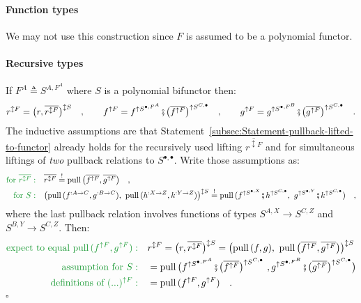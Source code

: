 \paragraph{Function types}

We may not use this construction since $F$ is assumed to be a polynomial
functor.

\paragraph{Recursive types}

If $F^{A}\triangleq S^{A,F^{A}}$ where $S$ is a polynomial bifunctor
then:
\[
r^{\updownarrow F}=\big(r,\overline{r^{\updownarrow F}}\big)^{\updownarrow S}\quad,\quad\quad f^{\uparrow F}=f^{\uparrow S^{\bullet,F^{A}}}\bef\big(\overline{f^{\uparrow F}}\big)^{\uparrow S^{C,\bullet}}\quad,\quad\quad g^{\uparrow F}=g^{\uparrow S^{\bullet,F^{B}}}\bef\big(\overline{g^{\uparrow F}}\big)^{\uparrow S^{C,\bullet}}\quad.
\]
The inductive assumptions are that Statement~\ref{subsec:Statement-pullback-lifted-to-functor}
already holds for the recursively used lifting $\overline{r^{\updownarrow F}}$
and for simultaneous liftings of \emph{two} pullback relations to
$S^{\bullet,\bullet}$. Write those assumptions as:
\begin{align*}
{\color{greenunder}\text{for }\overline{r^{\updownarrow F}}:}\quad & \overline{r^{\updownarrow F}}\overset{!}{=}\text{pull}\,\big(\overline{f^{\uparrow F}},\overline{g^{\uparrow F}}\big)\quad,\\
{\color{greenunder}\text{for }S:}\quad & \big(\text{pull}\,(f^{:A\rightarrow C},g^{:B\rightarrow C}),\,\,\text{pull}\,(h^{:X\rightarrow Z},k^{:Y\rightarrow Z})\big)^{\updownarrow S}\overset{!}{=}\text{pull}\,(f^{\uparrow S^{\bullet,X}}\bef h^{\uparrow S^{C,\bullet}},\,\,g^{\uparrow S^{\bullet,Y}}\bef k^{\uparrow S^{C,\bullet}})\quad,
\end{align*}
where the last pullback relation involves functions of types $S^{A,X}\rightarrow S^{C,Z}$
and $S^{B,Y}\rightarrow S^{C,Z}$. Then:
\begin{align*}
{\color{greenunder}\text{expect to equal }\text{pull}\,(f^{\uparrow F},g^{\uparrow F}):}\quad & r^{\updownarrow F}=\big(r,\overline{r^{\updownarrow F}}\big)^{\updownarrow S}=\big(\text{pull}\,(f,g),\,\,\text{pull}\,\big(\overline{f^{\uparrow F}},\overline{g^{\uparrow F}}\big)\big)^{\updownarrow S}\\
{\color{greenunder}\text{assumption for }S:}\quad & =\text{pull}\,\big(f^{\uparrow S^{\bullet,F^{A}}}\bef\big(\overline{f^{\uparrow F}}\big)^{\uparrow S^{C,\bullet}}\,\,,g^{\uparrow S^{\bullet,F^{B}}}\bef\big(\overline{g^{\uparrow F}}\big)^{\uparrow S^{C,\bullet}}\big)\\
{\color{greenunder}\text{definitions of }(...)^{\uparrow F}:}\quad & =\text{pull}\,(f^{\uparrow F},g^{\uparrow F})\quad.
\end{align*}
$\square$

